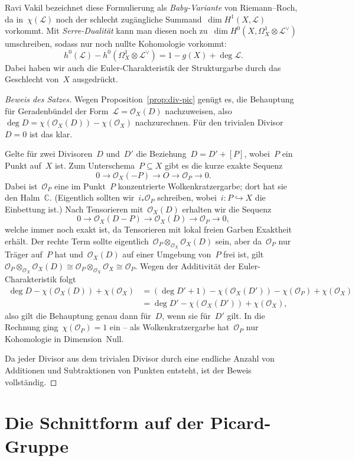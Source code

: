 \documentclass[a4paper,ngerman,12pt]{scrartcl}
\theoremstyle{definition}
\theoremstyle{plain}
\theoremstyle{remark}
\newcommand{\CC}{\mathbb{C}}
\renewcommand{\L}{\mathcal{L}}
\renewcommand{\O}{\mathcal{O}}
\newcommand{\lra}{\longrightarrow}
\begin{document}
Ravi Vakil bezeichnet diese Formulierung als \emph{Baby-Variante} von Riemann--Roch, da
in~$\chi(\L)$ noch der schlecht zugängliche Summand~$\dim H^1(X,\L)$ vorkommt.
Mit \emph{Serre-Dualität} kann man diesen noch zu~$\dim H^0(X,\Omega^1_X
\otimes \L^\vee)$ umschreiben, sodass nur noch
nullte Kohomologie vorkommt:
\[ h^0(\L) - h^0(\Omega^1_X \otimes \L^\vee) = 1-g(X) + \deg\L. \]
Dabei haben wir auch die Euler-Charakteristik der Strukturgarbe durch das
Geschlecht von~$X$ ausgedrückt.

\begin{proof}[Beweis des Satzes]Wegen Proposition~\ref{prop:div-pic} genügt es, die Behauptung für
Geradenbündel der Form~$\L = \O_X(D)$ nachzuweisen, also~$\deg D = \chi(\O_X(D))
- \chi(\O_X)$ nachzurechnen. Für den trivialen Divisor~$D = 0$ ist das klar.

Gelte für zwei Divisoren~$D$ und~$D'$ die Beziehung~$D = D' + [P]$, wobei~$P$
ein Punkt auf~$X$ ist. Zum Unterschema~$P \subseteq X$ gibt es die kurze exakte
Sequenz
\[ 0 \lra \O_X(-P) \lra O \lra \O_P \lra 0. \]
Dabei ist~$\O_P$ eine im Punkt~$P$ konzentrierte Wolkenkratzergarbe; dort hat
sie den Halm~$\CC$. (Eigentlich sollten wir~$i_* \O_P$ schreiben, wobei~$i : P
\hookrightarrow X$ die Einbettung ist.) Nach Tensorieren mit~$\O_X(D)$ erhalten
wir die Sequenz
\[ 0 \lra \O_X(D-P) \lra \O_X(D) \lra \O_P \lra 0, \]
welche immer noch exakt ist, da Tensorieren mit lokal freien Garben Exaktheit
erhält. Der rechte Term sollte eigentlich~$\O_P \otimes_{\O_X} \O_X(D)$ sein,
aber da~$\O_P$ nur Träger auf~$P$ hat und~$\O_X(D)$ auf einer Umgebung von~$P$
frei ist, gilt~$\O_P \otimes_{\O_X} \O_X(D) \cong \O_P \otimes_{\O_X} \O_X
\cong \O_P$. Wegen der Additivität der Euler-Charakteristik folgt
\begin{align*}
  \deg D - \chi(\O_X(D)) + \chi(\O_X)
  &= (\deg D' + 1) - \chi(\O_X(D')) - \chi(\O_P) + \chi(\O_X) \\
  &= \deg D' - \chi(\O_X(D')) + \chi(\O_X),
\end{align*}
also gilt die Behauptung genau dann für~$D$, wenn sie für~$D'$ gilt. In die
Rechnung ging~$\chi(\O_P) = 1$ ein -- als Wolkenkratzergarbe
hat~$\O_P$ nur Kohomologie in Dimension~Null.

Da jeder Divisor aus dem trivialen Divisor durch eine endliche Anzahl von
Additionen und Subtraktionen von Punkten entsteht, ist der Beweis vollständig.
\end{proof}


\section{Die Schnittform auf der Picard-Gruppe}
\end{document}
